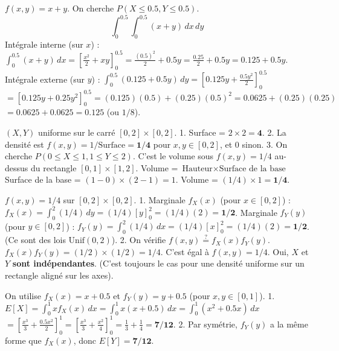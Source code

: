 \begin{correctionbox}
$f(x,y) = x+y$. On cherche $P(X \le 0.5, Y \le 0.5)$.
$$ \int_0^{0.5} \int_0^{0.5} (x+y) \, dx \, dy $$
Intégrale interne (sur $x$) : $\int_0^{0.5} (x+y) \, dx = \left[ \frac{x^2}{2} + xy \right]_0^{0.5} = \frac{(0.5)^2}{2} + 0.5y = \frac{0.25}{2} + 0.5y = 0.125 + 0.5y$.
Intégrale externe (sur $y$) : $\int_0^{0.5} (0.125 + 0.5y) \, dy = \left[ 0.125y + \frac{0.5y^2}{2} \right]_0^{0.5}$
$= [ 0.125y + 0.25y^2 ]_0^{0.5} = (0.125)(0.5) + (0.25)(0.5)^2 = 0.0625 + (0.25)(0.25)$
$= 0.0625 + 0.0625 = \mathbf{0.125}$ (ou $1/8$).
\end{correctionbox}

\begin{correctionbox}
$(X, Y)$ uniforme sur le carré $[0, 2] \times [0, 2]$.
1.  Surface = $2 \times 2 = \mathbf{4}$.
2.  La densité est $f(x,y) = 1 / \text{Surface} = \mathbf{1/4}$ pour $x,y \in [0, 2]$, et 0 sinon.
3.  On cherche $P(0 \le X \le 1, 1 \le Y \le 2)$. C'est le volume sous $f(x,y)=1/4$ au-dessus du rectangle $[0,1]\times[1,2]$.
    Volume = $\text{Hauteur} \times \text{Surface de la base}$
    Surface de la base = $(1-0) \times (2-1) = 1$.
    Volume = $(1/4) \times 1 = \mathbf{1/4}$.
\end{correctionbox}

\begin{correctionbox}
$f(x,y) = 1/4$ sur $[0, 2] \times [0, 2]$.
1.  Marginale $f_X(x)$ (pour $x \in [0, 2]$) :
    $f_X(x) = \int_0^2 (1/4) \, dy = (1/4) [y]_0^2 = (1/4)(2) = \mathbf{1/2}$.
    Marginale $f_Y(y)$ (pour $y \in [0, 2]$) :
    $f_Y(y) = \int_0^2 (1/4) \, dx = (1/4) [x]_0^2 = (1/4)(2) = \mathbf{1/2}$.
    (Ce sont des lois $\text{Unif}(0, 2)$).
2.  On vérifie $f(x,y) \stackrel{?}{=} f_X(x) f_Y(y)$.
    $f_X(x) f_Y(y) = (1/2) \times (1/2) = 1/4$.
    C'est égal à $f(x,y) = 1/4$.
    Oui, $X$ et $Y$ \textbf{sont indépendantes}. (C'est toujours le cas pour une densité uniforme sur un rectangle aligné sur les axes).
\end{correctionbox}


\begin{correctionbox}
On utilise $f_X(x) = x+0.5$ et $f_Y(y) = y+0.5$ (pour $x,y \in [0,1]$).
1.  $E[X] = \int_0^1 x f_X(x) \, dx = \int_0^1 x(x+0.5) \, dx = \int_0^1 (x^2 + 0.5x) \, dx$
    $= \left[ \frac{x^3}{3} + \frac{0.5x^2}{2} \right]_0^1 = \left[ \frac{x^3}{3} + \frac{x^2}{4} \right]_0^1 = \frac{1}{3} + \frac{1}{4} = \mathbf{7/12}$.
2.  Par symétrie, $f_Y(y)$ a la même forme que $f_X(x)$, donc $E[Y] = \mathbf{7/12}$.
\end{correctionbox}

